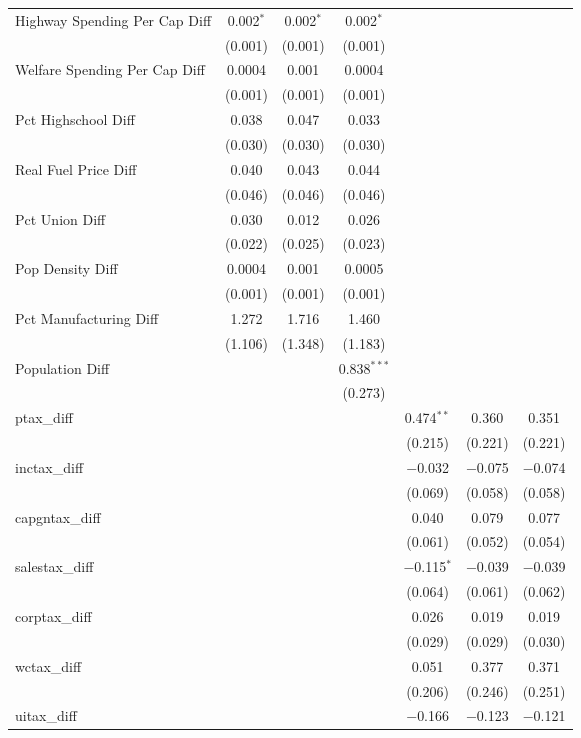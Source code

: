 \begin{table}[!htbp]
\begin{tabular}{@{\extracolsep{5pt}}lcccccc}
  Highway Spending Per Cap Diff & 0.002$^{*}$ & 0.002$^{*}$ & 0.002$^{*}$ &  &  &  \\ 
  & (0.001) & (0.001) & (0.001) &  &  &  \\ 
  Welfare Spending Per Cap Diff & 0.0004 & 0.001 & 0.0004 &  &  &  \\ 
  & (0.001) & (0.001) & (0.001) &  &  &  \\ 
  Pct Highschool Diff & 0.038 & 0.047 & 0.033 &  &  &  \\ 
  & (0.030) & (0.030) & (0.030) &  &  &  \\ 
  Real Fuel Price Diff & 0.040 & 0.043 & 0.044 &  &  &  \\ 
  & (0.046) & (0.046) & (0.046) &  &  &  \\ 
  Pct Union Diff & 0.030 & 0.012 & 0.026 &  &  &  \\ 
  & (0.022) & (0.025) & (0.023) &  &  &  \\ 
  Pop Density Diff & 0.0004 & 0.001 & 0.0005 &  &  &  \\ 
  & (0.001) & (0.001) & (0.001) &  &  &  \\ 
  Pct Manufacturing Diff & 1.272 & 1.716 & 1.460 &  &  &  \\ 
  & (1.106) & (1.348) & (1.183) &  &  &  \\ 
  Population Diff &  &  & 0.838$^{***}$ &  &  &  \\ 
  &  &  & (0.273) &  &  &  \\ 
  ptax\_diff &  &  &  & 0.474$^{**}$ & 0.360 & 0.351 \\ 
  &  &  &  & (0.215) & (0.221) & (0.221) \\ 
  inctax\_diff &  &  &  & $-$0.032 & $-$0.075 & $-$0.074 \\ 
  &  &  &  & (0.069) & (0.058) & (0.058) \\ 
  capgntax\_diff &  &  &  & 0.040 & 0.079 & 0.077 \\ 
  &  &  &  & (0.061) & (0.052) & (0.054) \\ 
  salestax\_diff &  &  &  & $-$0.115$^{*}$ & $-$0.039 & $-$0.039 \\ 
  &  &  &  & (0.064) & (0.061) & (0.062) \\ 
  corptax\_diff &  &  &  & 0.026 & 0.019 & 0.019 \\ 
  &  &  &  & (0.029) & (0.029) & (0.030) \\ 
  wctax\_diff &  &  &  & 0.051 & 0.377 & 0.371 \\ 
  &  &  &  & (0.206) & (0.246) & (0.251) \\ 
  uitax\_diff &  &  &  & $-$0.166 & $-$0.123 & $-$0.121 \\ 

\end{tabular}
\end{table}
